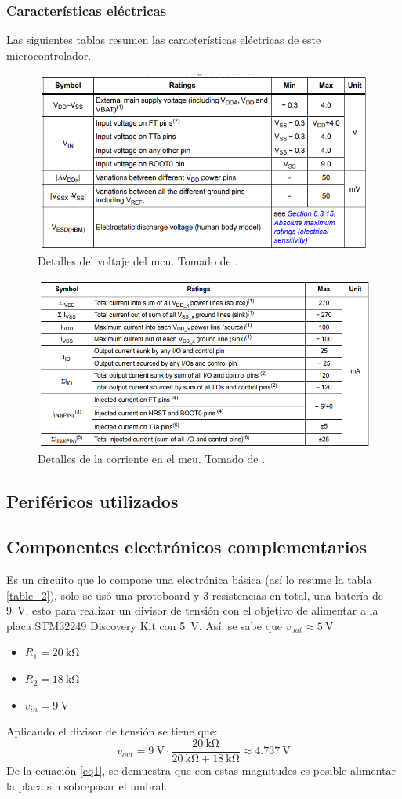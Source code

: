 \subsubsection*{Características eléctricas}
Las siguientes tablas resumen las características eléctricas de este microcontrolador.
\begin{figure}[H]
\centering
\includegraphics[width=.55\linewidth]{Imagenes/3.png}
 \caption{Detalles del voltaje del mcu. Tomado de \cite{web}.}
 \label{fig3}
\end{figure}

\begin{figure}[H]
\centering
\includegraphics[width=.55\linewidth]{Imagenes/4.png}
 \caption{Detalles de la corriente en el mcu. Tomado de \cite{web}.}
 \label{fig4}
\end{figure}


\subsection*{Periféricos utilizados}
\subsection*{Componentes electrónicos complementarios}
Es un circuito que lo compone una electrónica básica (así lo resume la tabla \ref{table_2}), solo se usó una protoboard y 3 resistencias en total, una batería de \SI{9}{\volt}, esto para realizar un divisor de tensión con el objetivo de alimentar a la placa STM32249 Discovery Kit con \SI{5}{\volt}. Así, se sabe que $v_{out} \approx \SI{5}{\volt}$
\begin{itemize}
\item $R_1 = \SI{20}{\kilo\ohm}$
\item $R_2 = \SI{18}{\kilo\ohm}$
\item $v_{in} =  \SI{9}{\volt}$
\end{itemize}
Aplicando el divisor de tensión se tiene que:
\begin{equation}
v_{out} = \SI{9}{\volt} \cdot \frac{  \SI{20}{\kilo\ohm} }{ \SI{20}{\kilo\ohm}+\SI{18}{\kilo\ohm}} \approx \SI{4.737}{\volt}
\label{eq1}
\end{equation}
De la ecuación \ref{eq1}, se demuestra que con estas magnitudes es posible alimentar la placa sin sobrepasar el umbral.
